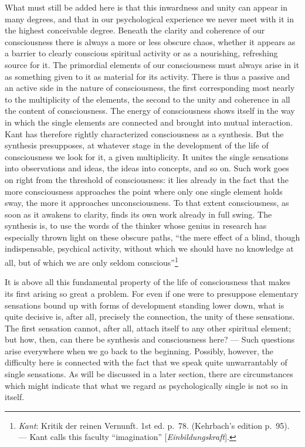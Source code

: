 \documentclass[12pt,a4paper]{book}
\newcommand{\opage}[1]{\marginnote{\footnotesize\textit{[#1]}}}
\begin{document}
What must still be added here is that this inwardness and unity can
appear in many degrees, and that in our psychological experience we
never meet with it in the highest conceivable degree. Beneath the
clarity and coherence of our consciousness there is always a more or
less obscure chaos, whether it appears as a barrier to clearly conscious
spiritual activity or as a nourishing, refreshing source for it. The
primordial elements of our consciousness must always arise in it as
something given to it as material for its activity. There is thus a
passive and an active side in the nature of consciousness, the first
corresponding most nearly to the multiplicity of the elements, the
second to the unity and coherence in all the content of consciousness.
The energy of consciousness shows itself in the way in which the single
elements are connected and brought into mutual interaction. Kant has
therefore rightly characterized consciousness as a synthesis. But the
synthesis presupposes, at whatever stage in the development of the life
of consciousness we look for it, a given multiplicity. It unites the
single sensations into observations and ideas, the ideas into concepts,
and so on. Such work goes on right from the threshold of consciousness:
it lies already in the fact that the more
\opage{59}consciousness approaches the point where only one single
element holds sway, the more it approaches unconsciousness. To that
extent consciousness, as soon as it awakens to clarity, finds its own
work already in full swing. The synthesis is, to use the words of the
thinker whose genius in research has especially thrown light on these
obscure paths, ``the mere effect of a blind, though indispensable,
psychical activity, without which we should have no knowledge at all,
but of which we are only seldom
conscious''\footnote{\emph{Kant}: Kritik der reinen Vernunft. 1st ed.
p.~78. (Kehrbach's edition p.~95). --- Kant calls this faculty
``imagination'' [\textit{Einbildungskraft}].}

It is above all this fundamental property of the life of consciousness
that makes its first arising so great a problem. For even if one were to
presuppose elementary sensations bound up with forms of development
standing lower down, what is quite decisive is, after all, precisely the
connection, the unity of these sensations. The first sensation cannot,
after all, attach itself to any other spiritual element; but how, then,
can there be synthesis and consciousness here? --- Such questions arise
everywhere when we go back to the beginning. Possibly, however, the
difficulty here is connected with the fact that we speak quite
unwarrantably of single sensations. As will be discussed in a later
section, there are circumstances which might indicate that what we
regard as psychologically single is not so in itself.
\end{document}
